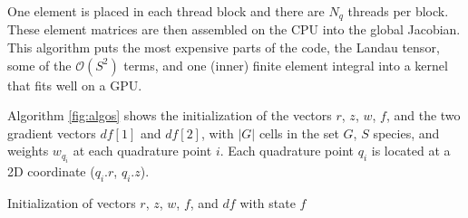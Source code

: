 \documentclass[12pt]{siamart}
\newcommand{\Order}[1]{\ensuremath{\mathcal{O}(#1)}}    %
\begin{document}
One element is placed in each thread block and there are $N_q$ threads per block.
These element matrices are then assembled on the CPU into the global Jacobian.
This algorithm puts the most expensive parts of the code, the Landau tensor, some of the $\Order{S^2}$ terms, and one (inner) finite element integral into a kernel that fits well on a GPU.

Algorithm \ref{fig:algos}
shows the initialization of the vectors $r$, $z$, $w$, $f$, and the
two gradient vectors $df[1]$ and $df[2]$, with $|G|$ cells in the set
$G$, $S$ species, and weights $w_{q_i}$ at each quadrature point $i$.
Each quadrature point $q_i$ is located at a 2D coordinate ($q_i.r$,
$q_i.z$).
\begin{algorithm}[h!]
\begin{algorithmic}[100]
\ENDFOR
\ENDFOR
\ENDFOR
\end{algorithmic} 
\caption{Initialization of vectors $r$, $z$, $w$, $f$, and $df$ with state $f$}
\label{fig:algos}
\end{algorithm}
\end{document}
